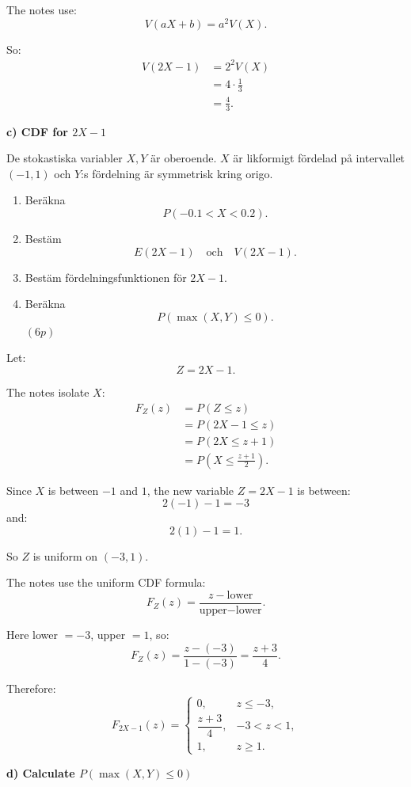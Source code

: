 \documentclass[10pt]{article}
\begin{document}
The notes use:
\[
V(aX+b)=a^2V(X).
\]

So:
\begin{align*}
V(2X-1)
&=
2^2V(X)
\\[2mm]
&=
4\cdot \frac13
\\[2mm]
&=
\frac43.
\end{align*}

\textbf{c) CDF for \(2X-1\)}

De stokastiska variabler \(X,Y\) är oberoende.
\(X\) är likformigt fördelad på intervallet
\((-1,1)\) och \(Y\):s fördelning är symmetrisk
kring origo.

\begin{enumerate}[label=\alph*)]
\item Beräkna
\[
P(-0.1<X<0.2).
\]

\item Bestäm
\[
E(2X-1)
\quad\text{och}\quad
V(2X-1).
\]

\item Bestäm fördelningsfunktionen för \(2X-1\).

\item Beräkna
\[
P(\max(X,Y)\le 0).
\]
\((6p)\)
\end{enumerate}

Let:
\[
Z=2X-1.
\]

The notes isolate \(X\):
\begin{align*}
F_Z(z)
&=
P(Z\le z)
\\[2mm]
&=
P(2X-1\le z)
\\[2mm]
&=
P(2X\le z+1)
\\[2mm]
&=
P\left(X\le \frac{z+1}{2}\right).
\end{align*}

Since \(X\) is between \(-1\) and \(1\), the new
variable \(Z=2X-1\) is between:
\[
2(-1)-1=-3
\]
and:
\[
2(1)-1=1.
\]

So \(Z\) is uniform on \((-3,1)\).

The notes use the uniform CDF formula:
\[
F_Z(z)
=
\frac{z-\text{lower}}{\text{upper}-\text{lower}}.
\]

Here lower \(=-3\), upper \(=1\), so:
\[
F_Z(z)
=
\frac{z-(-3)}{1-(-3)}
=
\frac{z+3}{4}.
\]

Therefore:
\[
F_{2X-1}(z)=
\begin{cases}
0,
& z\le -3,\\
\dfrac{z+3}{4},
& -3<z<1,\\
1,
& z\ge 1.
\end{cases}
\]

\textbf{d) Calculate \(P(\max(X,Y)\le 0)\)}
\end{document}
